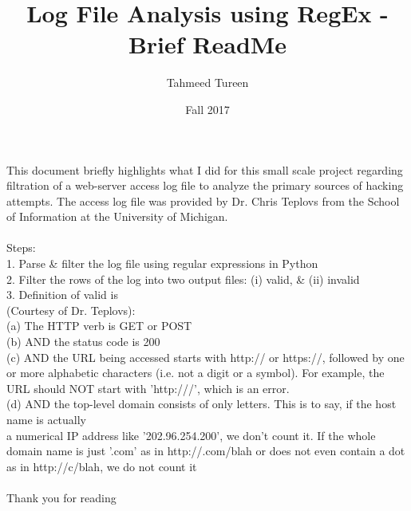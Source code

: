 \documentclass[11pt]{article}
\begin{document}
\title{Log File Analysis using RegEx - Brief ReadMe}
\author{Tahmeed Tureen}
\date{Fall 2017}
\maketitle

This document briefly highlights what I did for this small scale project regarding filtration of a web-server access log file to analyze the primary sources of hacking attempts. The access log file was provided by Dr. Chris Teplovs from the School of Information at the University of Michigan. \\~\\



Steps:\\
1. Parse \& filter the log file using regular expressions in Python\\
2. Filter the rows of the log into two output files: (i) valid, \& (ii) invalid\\
3. Definition of valid is \\

(Courtesy of Dr. Teplovs):\\
(a) The HTTP verb is GET or POST\\
(b) AND the status code is 200\\
(c) AND the URL being accessed starts with http:// or https://, followed by one or more alphabetic characters (i.e. not a digit or a symbol).  For example, the URL should NOT start with 'http:///', which is an error.\\
(d) AND the top-level domain consists of only letters. This is to say, if the host name is actually\\
a numerical IP address like '202.96.254.200', we don’t count it. If the whole domain name is just '.com' as in http://.com/blah or does not even contain a dot as in http://c/blah, we do not count it\\~\\



Thank you for reading\\
\end{document}
